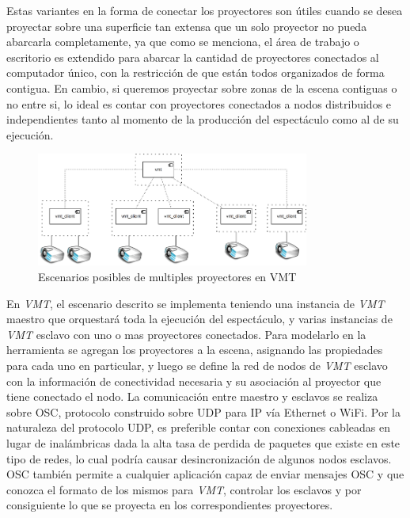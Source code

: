 Estas variantes en la forma de conectar los proyectores son útiles cuando se desea proyectar sobre una superficie tan extensa que un solo proyector no pueda abarcarla completamente, ya que como se menciona, el área de trabajo o escritorio es extendido para abarcar la cantidad de proyectores conectados al computador único, con la restricción de que están todos organizados de forma contigua. En cambio, si queremos proyectar sobre zonas de la escena contiguas o no entre si, lo ideal es contar con proyectores conectados a nodos distribuidos e independientes tanto al momento de la producción del espectáculo como al de su ejecución.

\begin{figure}[H]
  \centering
    \includegraphics[width=0.8\textwidth]{./Cap5_vmt/vmt_multiProjector.png}
  \caption{Escenarios posibles de multiples proyectores en VMT}
  \label{fig:VMT-MultiProjector}
\end{figure}


En \emph{VMT}, el escenario descrito se implementa teniendo una instancia de \emph{VMT} maestro que orquestará toda la ejecución del espectáculo, y varias instancias de \emph{VMT} esclavo con uno o mas proyectores conectados. Para modelarlo en la herramienta se agregan los proyectores a la escena, asignando las propiedades para cada uno en particular, y luego se define la red de nodos de \emph{VMT} esclavo con la información de conectividad necesaria y su asociación al proyector que tiene conectado el nodo. La comunicación entre maestro y esclavos se realiza sobre OSC, protocolo construido sobre UDP para IP vía Ethernet o WiFi. Por la naturaleza del protocolo UDP, es preferible contar con conexiones cableadas en lugar de inalámbricas dada la alta tasa de perdida de paquetes que existe en este tipo de redes, lo cual podría causar desincronización de algunos nodos esclavos. OSC también permite a cualquier aplicación capaz de enviar mensajes OSC y que conozca el formato de los mismos para \emph{VMT}, controlar los esclavos y por consiguiente lo que se proyecta en los correspondientes proyectores.


